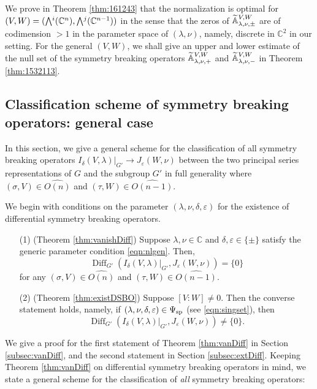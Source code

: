 We prove in Theorem \ref{thm:161243}
 that the normalization is optimal
 for $(V,W)=(\Exterior^i({\mathbb{C}}^n), \Exterior^j({\mathbb{C}}^{n-1}))$
 in the sense
 that the zeros of ${\widetilde{\mathbb{A}}}_{{\lambda},{\nu},{\pm}}^{{V,W}}$
 are of codimension $>1$
 in the parameter space
 of $(\lambda,\nu)$, 
 namely,
 discrete in ${\mathbb{C}}^2$
 in our setting.  
For the general $(V,W)$, 
 we shall give an upper and lower estimate
 of the null set of 
 the symmetry breaking operators 
 ${\widetilde{\mathbb{A}}}_{{\lambda},{\nu},{+}}^{{V,W}}$ 
 and ${\widetilde{\mathbb{A}}}_{{\lambda},{\nu},{-}}^{{V,W}}$
 in Theorem \ref{thm:1532113}.    


\subsection{
Classification scheme of symmetry breaking operators: general case}
\label{subsec:170228}

In this section,
we give a general scheme 
 for the classification of all symmetry breaking operators
 $I_{\delta}(V,\lambda)|_{G'} \to J_{\varepsilon}(W,\nu)$
 between the two principal series representations
 of $G$ and the subgroup $G'$
 in full generality
 where $(\sigma,V)\in \widehat{O(n)}$
 and $(\tau,W)\in \widehat{O(n-1)}$. 



We begin with conditions
on the parameter $(\lambda, \nu, \delta, \varepsilon)$
 for the existence of differential symmetry breaking operators.  
\begin{theorem}
\label{thm:vanDiff}
\qquad\qquad
\begin{enumerate}
\item[{\rm{(1)}}]
(Theorem {\ref{thm:vanishDiff}})
Suppose $\lambda, \nu \in {\mathbb{C}}$
 and $\delta, \varepsilon \in \{\pm\}$
 satisfy the generic parameter condition \eqref{eqn:nlgen}.  
Then,
\[
   {\operatorname{Diff}}_{G'}
   (I_{\delta}(V,\lambda)|_{G'}, J_{\varepsilon}(W,\nu))
   =\{0\}
\]
for any $(\sigma, V) \in \widehat{O(n)}$
 and $(\tau, W) \in \widehat{O(n-1)}$.  
\item[{\rm{(2)}}]
(Theorem {\ref{thm:existDSBO}})
Suppose $[V:W]\ne 0$.  
Then the converse statement holds,
 namely,
 if 
$(\lambda, \nu, \delta, \varepsilon) \in \Psi_{{\operatorname{sp}}}$
 (see \eqref{eqn:singset}), 
 then 
\[
   {\operatorname{Diff}}_{G'}
   (I_{\delta}(V,\lambda)|_{G'}, J_{\varepsilon}(W,\nu))
   \ne\{0\}.  
\]
\end{enumerate}
\end{theorem}
We give a proof for the first statement of Theorem \ref{thm:vanDiff}
 in Section \ref{subsec:vanDiff}, 
 and the second statement in Section \ref{subsec:extDiff}.  
Keeping Theorem \ref{thm:vanDiff} 
 on differential symmetry breaking operators in mind, 
 we state a general scheme for the classification
 of {\it{all}} symmetry breaking operators:

